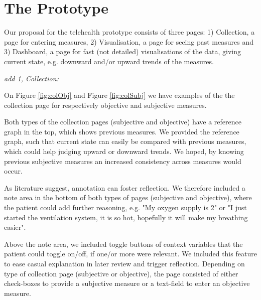 \section{The Prototype}

Our proposal for the telehealth prototype consists of three pages: 1) Collection, a page for entering measures, 2) Visualisation, a page for seeing past measures and 3) Dashboard, a page for fast (not detailed) visualisations of the data, giving current state, e.g. downward and/or upward trends of the measures.

\textit{add 1, Collection:}

On Figure \ref{fig:colObj} and Figure \ref{fig:colSubj} we have examples of the the collection page for respectively objective and subjective measures. 

Both types of the collection pages (subjective and objective) have a reference graph in the top, which shows previous measures. We provided the reference graph, such that current state can easily be compared with previous measures, which could help judging upward or downward trends. We hoped, by knowing previous subjective measures an increased consistency across measures would occur. 

As literature suggest, annotation can foster reflection. We therefore included a note area in the bottom of both types of pages (subjective and objective), where the patient could add further reasoning, e.g. "My oxygen supply is 2" or "I just started the ventilation system, it is so hot, hopefully it will make my breathing easier". 

Above the note area, we included toggle buttons of context variables that the patient could toggle on/off, if one/or more were relevant. We included this feature to ease casual explanation in later review and trigger reflection. Depending on type of collection page (subjective or objective), the page consisted of either check-boxes to provide a subjective measure or a text-field to enter an objective measure.


